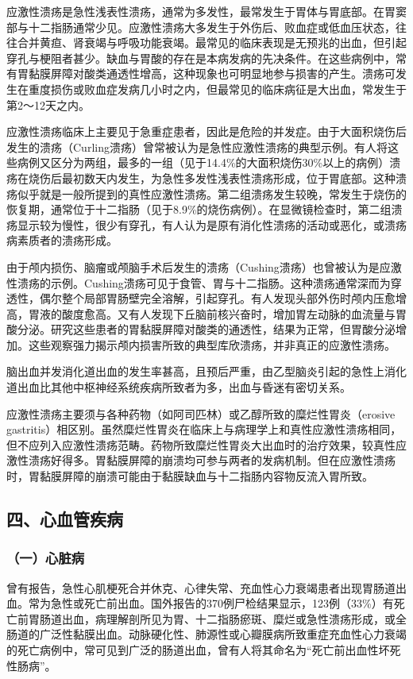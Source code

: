 应激性溃疡是急性浅表性溃疡，通常为多发性，最常发生于胃体与胃底部。在胃窦部与十二指肠通常少见。应激性溃疡大多发生于外伤后、败血症或低血压状态，往往合并黄疸、肾衰竭与呼吸功能衰竭。最常见的临床表现是无预兆的出血，但引起穿孔与梗阻者甚少。缺血与胃酸的存在是本病发病的先决条件。在这些病例中，常有胃黏膜屏障对酸类通透性增高，这种现象也可明显地参与损害的产生。溃疡可发生在重度损伤或败血症发病几小时之内，但最常见的临床病征是大出血，常发生于第2～12天之内。

应激性溃疡临床上主要见于急重症患者，因此是危险的并发症。由于大面积烧伤后发生的溃疡（Curling溃疡）曾常被认为是急性应激性溃疡的典型示例。有人将这些病例又区分为两组，最多的一组（见于14.4\%的大面积烧伤30\%以上的病例）溃疡在烧伤后最初数天内发生，为急性多发性浅表性溃疡形成，位于胃底部。这种溃疡似乎就是一般所提到的真性应激性溃疡。第二组溃疡发生较晚，常发生于烧伤的恢复期，通常位于十二指肠（见于8.9\%的烧伤病例）。在显微镜检查时，第二组溃疡显示较为慢性，很少有穿孔，有人认为是原有消化性溃疡的活动或恶化，或溃疡病素质者的溃疡形成。

由于颅内损伤、脑瘤或颅脑手术后发生的溃疡（Cushing溃疡）也曾被认为是应激性溃疡的示例。Cushing溃疡可见于食管、胃与十二指肠。这种溃疡通常深而为穿透性，偶尔整个局部胃肠壁完全溶解，引起穿孔。有人发现头部外伤时颅内压愈增高，胃液的酸度愈高。又有人发现下丘脑前核兴奋时，增加胃左动脉的血流量与胃酸分泌。研究这些患者的胃黏膜屏障对酸类的通透性，结果为正常，但胃酸分泌增加。这些观察强力揭示颅内损害所致的典型库欣溃疡，并非真正的应激性溃疡。

脑出血并发消化道出血的发生率甚高，且预后严重，由乙型脑炎引起的急性上消化道出血比其他中枢神经系统疾病所致者为多，出血与昏迷有密切关系。

应激性溃疡主要须与各种药物（如阿司匹林）或乙醇所致的糜烂性胃炎（erosive
gastritis）相区别。虽然糜烂性胃炎在临床上与病理学上和真性应激性溃疡相同，但不应列入应激性溃疡范畴。药物所致糜烂性胃炎大出血时的治疗效果，较真性应激性溃疡好得多。胃黏膜屏障的崩溃均可参与两者的发病机制。但在应激性溃疡时，胃黏膜屏障的崩溃可能由于黏膜缺血与十二指肠内容物反流入胃所致。

\subsection{四、心血管疾病}

\subsubsection{（一）心脏病}

曾有报告，急性心肌梗死合并休克、心律失常、充血性心力衰竭患者出现胃肠道出血。常为急性或死亡前出血。国外报告的370例尸检结果显示，123例（33\%）有死亡前胃肠道出血，病理解剖所见为胃、十二指肠瘀斑、糜烂或急性溃疡形成，或全肠道的广泛性黏膜出血。动脉硬化性、肺源性或心瓣膜病所致重症充血性心力衰竭的死亡病例中，常可见到广泛的肠道出血，曾有人将其命名为“死亡前出血性坏死性肠病”。

